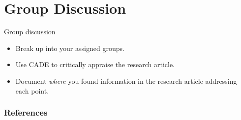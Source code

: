 \documentclass{beamer}
\begin{document}
\section{Group Discussion}

\begin{frame}{Group discussion}
	\begin{itemize}
	\item Break up into your assigned groups.
	\item Use CADE \citep[p. 155]{Dollaghan2007a} to critically appraise the research article.
	\item Document \emph{where} you found information in the research article addressing each point.
	\end{itemize}
\end{frame}

\begin{frame}[allowframebreaks]%
	\begin{center}
	\frametitle{References}
	
	\small
	\end{center}
\end{frame}
\end{document}
